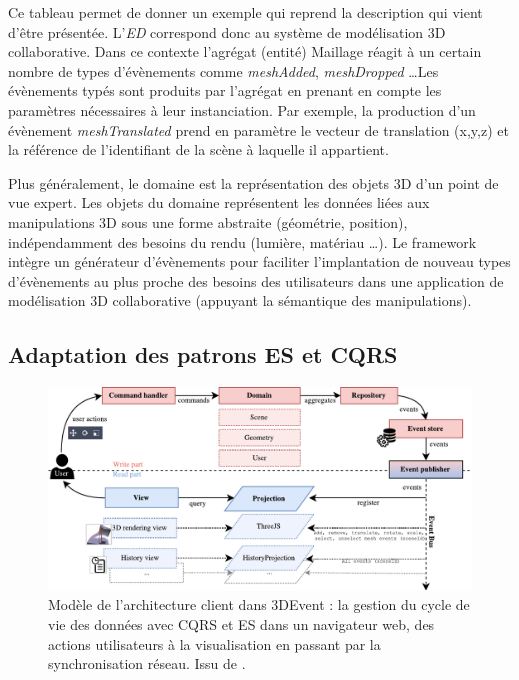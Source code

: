 Ce tableau permet de donner un exemple qui reprend la description qui vient d'être 
présentée. L'\textit{ED} correspond donc au \og système de modélisation 3D 
collaborative\fg{}. Dans ce contexte l'agrégat (entité) \og Maillage\fg{} réagit à un 
certain nombre de types d'évènements comme \textit{meshAdded}, 
\textit{meshDropped} \dots Les évènements typés sont produits par l'agrégat en 
prenant en compte les paramètres nécessaires à leur instanciation. Par exemple, 
la production d'un évènement \textit{meshTranslated} prend en paramètre le 
vecteur de translation (x,y,z) et la référence de l'identifiant de la scène à laquelle il 
appartient.


Plus généralement, le domaine est la représentation des objets 3D d'un point de 
vue expert. Les objets du domaine représentent les données liées aux 
manipulations 3D sous une forme abstraite (géométrie, position), indépendamment
des besoins du rendu (lumière, matériau \dots). Le framework intègre un 
générateur d'évènements pour faciliter l'implantation de nouveau types 
d'évènements au plus proche des besoins des utilisateurs dans une application de 
modélisation 3D collaborative (appuyant la sémantique des manipulations).





\subsection{Adaptation des patrons \gls{ES} et \gls{CQRS}}

\begin{figure}[ht]
	\centering
	\includegraphics[width=0.9\columnwidth]{eps/cqrs2.pdf}
	\caption[Modèle de l'architecture client dans 3DEvent]{Modèle de l'architecture 
		client dans 3DEvent : la gestion du cycle de vie des données avec 
		\gls{CQRS} 
		et \gls{ES} dans un navigateur web, des actions utilisateurs à la visualisation 
		en passant par la synchronisation réseau. Issu de \cite{Desprat2017}.}
	\label{fig:cqrs-client}
\end{figure}

